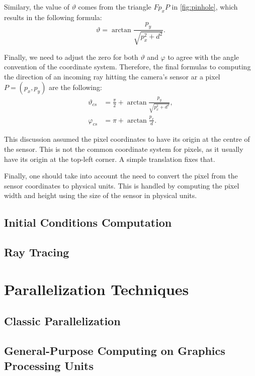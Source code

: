Similary, the value of $\vartheta$ comes from the triangle $Fp_xP$ in \autoref{fig:pinhole}, which results in the following formula:
\[
	\vartheta = \arctan{\frac{p_y}{\sqrt{p_x^2 + d^2}}}.
\]

Finally, we need to adjust the zero for both $\vartheta$ and $\varphi$ to agree with the angle convention of the coordinate system. Therefore, the final formulas to computing the direction of an incoming ray hitting the camera's sensor ar a pixel $P = (p_x, p_y)$ are the following:
\begin{align}
	\vartheta_{cs} &= \frac{\pi}{2} + \arctan{\frac{p_y}{\sqrt{p_x^2 + d^2}}}, \\
	\varphi_{cs} &= \pi + \arctan{\frac{p_x}{d}}.
\end{align}

This discussion assumed the pixel coordinates to have its origin at the centre of the sensor. This is not the common coordinate system for pixels, as it usually have its origin at the top-left corner. A simple translation fixes that.

Finally, one should take into account the need to convert the pixel from the sensor coordinates to physical units. This is handled by computing the pixel width and height using the size of the sensor in physical units.

\subsection{Initial Conditions Computation}
\subsection{Ray Tracing}

\section{Parallelization Techniques}
\subsection{Classic Parallelization}
\subsection{General-Purpose Computing on Graphics Processing Units}
